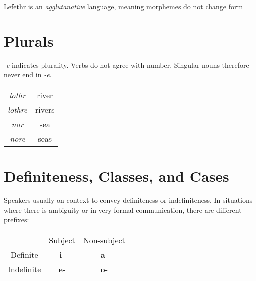 \documentclass[letterpaper,twocolumn,openany,nodeprecatedcode,hidelinks]{dndbook}
\begin{document}


\twocolumn



Lefethr is an \textit{agglutanative} language, meaning morphemes do not change form


\section*{Plurals}
\textit{-e} indicates plurality. Verbs do not agree with number. Singular nouns therefore never end in \textit{-e}.

\begin{center}
\begin{tabular}{|c c|}
     \hline

    \textit{lothr} &  river \\
     \textit{lothre} & rivers \\

     \hline
     \hline

     \textit{nor} & sea \\

     \textit{nore} & seas \\
     \hline
     
\end{tabular}
\end{center}





\section*{Definiteness, Classes, and Cases}

Speakers usually on context to convey definiteness or indefiniteness.
In situations where there is ambiguity or in very formal communication, there are different prefixes:

\begin{table}[H]
    \centering
    \begin{tabular}{ccc}
         &  Subject& Non-subject\\
         Definite&  \textbf{i}-& \textbf{a}-\\
         Indefinite&  \textbf{e}-& \textbf{o}-\\
    \end{tabular}
\end{table}
\end{document}
